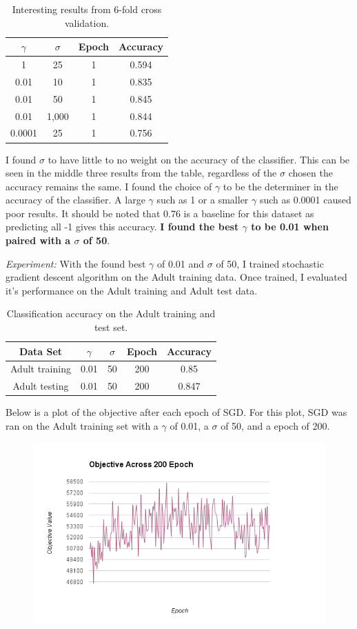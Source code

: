 \documentclass[11pt]{article}
\begin{document}
\begin{table}[H]
\centering
{\renewcommand{\arraystretch}{1.2}%
\begin{tabular}{| c | c | c | c |}
\hline
$\gamma$ & $\sigma$ & Epoch & Accuracy\\
\hline
1 & 25 & 1 & 0.594\\ \hline
0.01 & 10 & 1 & 0.835\\ \hline
0.01 & 50 & 1 & 0.845\\ \hline
0.01 & 1,000 & 1 & 0.844\\ \hline
0.0001 & 25 & 1 & 0.756\\ \hline
\end{tabular}}
\caption{Interesting results from 6-fold cross validation.}
\end{table}

I found $\sigma$ to have little to no weight on the accuracy of the classifier. This can be seen in the middle three results from the table, regardless of the $\sigma$ chosen the accuracy remains the same. I found the choice of $\gamma$ to be the determiner in the accuracy of the classifier. A large $\gamma$ such as 1 or a smaller $\gamma$ such as 0.0001 caused poor results. It should be noted that 0.76 is a baseline for this dataset as predicting all -1 gives this accuracy. \textbf{I found the best $\gamma$ to be 0.01 when paired with a $\sigma$ of 50}.

\textit{Experiment:} With the found best $\gamma$ of 0.01 and $\sigma$ of 50, I trained stochastic gradient descent algorithm on the Adult training data. Once trained, I evaluated it's performance on the Adult training and Adult test data.

\begin{table}[H]
\centering
{\renewcommand{\arraystretch}{1.2}%
\begin{tabular}{| c | c | c | c | c |}
\hline
Data Set & $\gamma$ & $\sigma$ & Epoch & Accuracy\\
\hline
Adult training & 0.01 & 50 & 200 & 0.85\\ \hline
Adult testing & 0.01 & 50 & 200 & 0.847\\ \hline
\end{tabular}}
\caption{Classification accuracy on the Adult training and test set.}
\end{table}

Below is a plot of the objective after each epoch of SGD. For this plot, SGD was ran on the Adult training set with a $\gamma$ of 0.01, a $\sigma$ of 50, and a epoch of 200.

\begin{figure}[H]
  \centerline{\includegraphics[width=1\linewidth]{objective.png}}
\end{figure}
\end{document}

